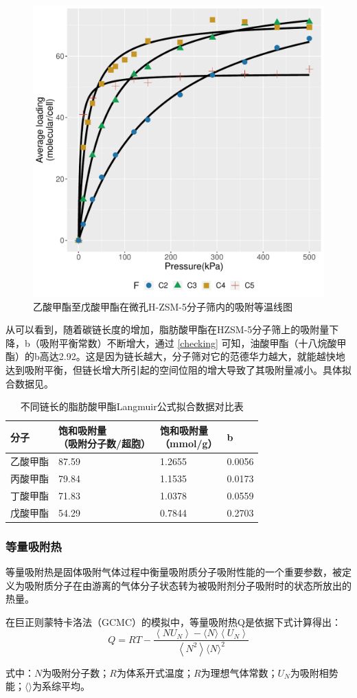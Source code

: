 \begin{figure}[H]
    \centering
        \includegraphics[width=0.5\linewidth]{figure/Adsorption/length.pdf}
    \caption{乙酸甲酯至戊酸甲酯在微孔H-ZSM-5分子筛内的吸附等温线图}
    \label{fig:C2_C5}
\end{figure}
\par{从可以看到，随着碳链长度的增加，脂肪酸甲酯在HZSM-5分子筛上的吸附量下降，b（吸附平衡常数）不断增大，通过 \ref{checking} 可知，油酸甲酯（十八烷酸甲酯）的b高达2.92。这是因为链长越大，分子筛对它的范德华力越大，就能越快地达到吸附平衡，但链长增大所引起的空间位阻的增大导致了其吸附量减小。具体拟合数据见。}
\begin{table}[H]
	\small
	\centering
	\caption{不同链长的脂肪酸甲酯Langmuir公式拟合数据对比表}
	\begin{tabular}{p{3cm}<{\centering}p{4cm}<{\centering}p{2.5cm}<{\centering}p{2.5cm}<{\centering}}
        \toprule
        分子&\makecell*[c]{饱和吸附量\\（吸附分子数/超胞）}&\makecell*[c]{饱和吸附量\\（mmol/g）}&b\\
        \midrule
        乙酸甲酯&87.59&1.2655&0.0056\\
        丙酸甲酯&79.84&1.1535&0.0173\\
        丁酸甲酯&71.83&1.0378&0.0559\\
        戊酸甲酯&54.29&0.7844&0.2703\\
		\bottomrule
	\end{tabular}
	\label{tab:C2_C5}
\end{table}
\subsubsection{等量吸附热}
\par{等量吸附热是固体吸附气体过程中衡量吸附质分子吸附性能的一个重要参数，被定义为吸附质分子在由游离的气体分子状态转为被吸附剂分子吸附时的状态所放出的热量。}
\par{在巨正则蒙特卡洛法（GCMC）的模拟中，等量吸附热Q是依据下式计算得出：}
\begin{equation}
    Q=R T-\frac{\left\langle N U_{N}\right\rangle-\langle N\rangle\left\langle U_{N}\right\rangle}{\left\langle N^{2}\right\rangle\langle N\rangle^{2}}
    \end{equation}
\par{式中：$N$为吸附分子数；$R$为体系开式温度；$R$为理想气体常数；$U_N$为吸附相势能；$ \langle \rangle$为系综平均。}

